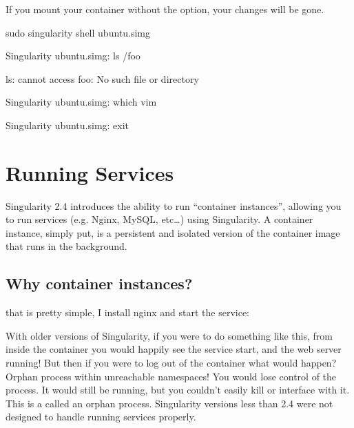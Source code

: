 \documentclass[letterpaper,10pt,english]{sphinxmanual}
\begin{document}
If you mount your container without the  option, your changes will be
gone.

%
\begin{sphinxVerbatim}[commandchars=\\\{\}]
\PYGZdl{} sudo singularity shell ubuntu.simg

Singularity ubuntu.simg:\PYGZti{}\PYGZgt{} ls /foo

ls: cannot access \PYGZsq{}foo\PYGZsq{}: No such file or directory

Singularity ubuntu.simg:\PYGZti{}\PYGZgt{} which vim

Singularity ubuntu.simg:\PYGZti{}\PYGZgt{} exit
\end{sphinxVerbatim}


\chapter{Running Services}
\label{\detokenize{running_services:running-services}}\label{\detokenize{running_services::doc}}
Singularity 2.4 introduces the ability to run “container instances”,
allowing you to run services (e.g. Nginx, MySQL, etc…) using
Singularity. A container instance, simply put, is a persistent and
isolated version of the container image that runs in the background.


\section{Why container instances?}
\label{\detokenize{running_services:why-container-instances}}
that is pretty simple, I install nginx and start the service:

%
\begin{sphinxVerbatim}[commandchars=\\\{\}]
      

  
\end{sphinxVerbatim}

With older versions of Singularity, if you were to do something like
this, from inside the container you would happily see the service
start, and the web server running! But then if you were to log out of
the container what would happen?
Orphan process within unreachable namespaces!
You would lose control of the process. It would still be running, but
you couldn’t easily kill or interface with it. This is a called an
orphan process. Singularity versions less than 2.4 were not designed
to handle running services properly.
\end{document}
